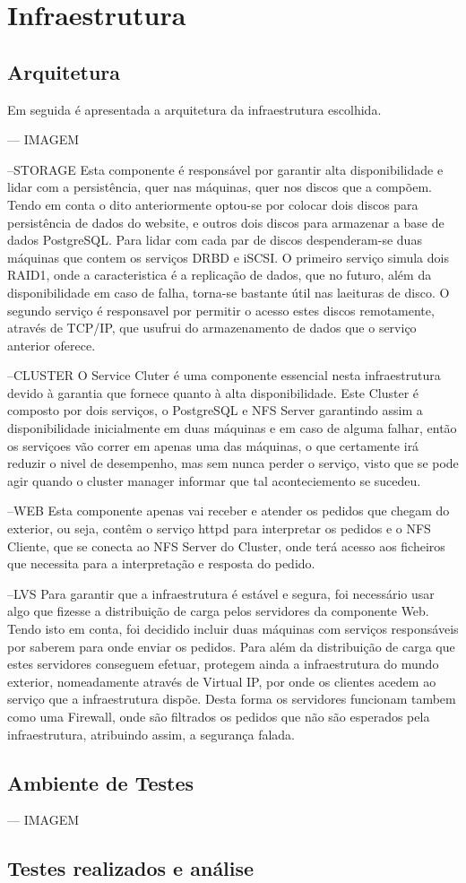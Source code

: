 \section{Infraestrutura}

\subsection{Arquitetura}

Em seguida é apresentada a arquitetura da infraestrutura escolhida.

--- IMAGEM

--STORAGE
Esta componente é responsável por garantir alta disponibilidade e lidar com a persistência, quer nas máquinas, quer nos discos que a compõem. Tendo em conta o dito anteriormente optou-se por colocar dois discos para persistência de dados do website, e outros dois discos para armazenar a base de dados PostgreSQL. Para lidar com cada par de discos despenderam-se duas máquinas que contem os serviços DRBD e iSCSI. O primeiro serviço simula dois RAID1, onde a caracteristica é a replicação de dados, que no futuro, além da disponibilidade em caso de falha, torna-se bastante útil nas laeituras de disco. O segundo serviço é responsavel por permitir o acesso estes discos remotamente, através de TCP/IP, que usufrui do armazenamento de dados que o serviço anterior oferece.

--CLUSTER
O Service Cluter é uma componente essencial nesta infraestrutura devido à garantia que fornece quanto à alta disponibilidade. Este Cluster é composto por dois serviços, o PostgreSQL e NFS Server garantindo assim a disponibilidade inicialmente em duas máquinas e em caso de alguma falhar, então os serviçoes vão correr em apenas uma das máquinas, o que certamente irá reduzir o nivel de desempenho, mas sem nunca perder o serviço, visto que se pode agir quando o cluster manager informar que tal aconteciemento se sucedeu.

--WEB
Esta componente apenas vai receber e atender os pedidos que chegam do exterior, ou seja, contêm o serviço httpd para interpretar os pedidos e o NFS Cliente, que se conecta ao NFS Server do Cluster, onde terá acesso aos ficheiros que necessita para a interpretação e resposta do pedido.

--LVS
Para garantir que a infraestrutura é estável e segura, foi necessário usar algo que fizesse a distribuição de carga pelos servidores da componente Web. Tendo isto em conta, foi decidido incluir duas máquinas com serviços responsáveis por saberem para onde enviar os pedidos. Para além da distribuição de carga que estes servidores conseguem efetuar, protegem ainda a infraestrutura do mundo exterior, nomeadamente através de Virtual IP, por onde os clientes acedem ao serviço que a infraestrutura dispõe. Desta forma os servidores funcionam tambem como uma Firewall, onde são filtrados os pedidos que não são esperados pela infraestrutura, atribuindo assim, a segurança falada.


\subsection{Ambiente de Testes}

--- IMAGEM


\subsection{Testes realizados e análise}

